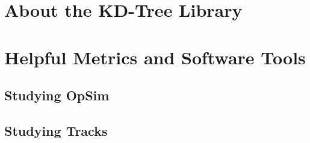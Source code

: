 \appendix
\section{About the KD-Tree Library}
\label{kdTreeLib}

\section{Helpful Metrics and Software Tools}
\subsection{Studying OpSim}
\subsection{Studying Tracks}

